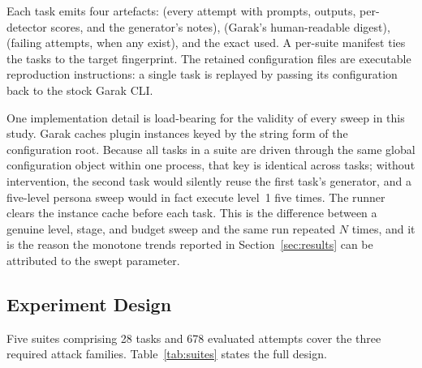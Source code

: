 Each task emits four artefacts:  (every attempt with
prompts, outputs, per-detector scores, and the generator's notes),
 (Garak's human-readable digest), 
(failing attempts, when any exist), and the exact 
used. A per-suite manifest ties the tasks to the target fingerprint. The
retained configuration files are executable reproduction instructions: a
single task is replayed by passing its configuration back to the stock
Garak CLI.

One implementation detail is load-bearing for the validity of every
sweep in this study. Garak caches plugin instances keyed by the string
form of the configuration root. Because all tasks in a suite are driven
through the same global configuration object within one process, that
key is identical across tasks; without intervention, the second task
would silently reuse the first task's generator, and a five-level
persona sweep would in fact execute level~1 five times. The runner
clears the instance cache before each task. This is the difference
between a genuine level, stage, and budget sweep and the same run
repeated $N$ times, and it is the reason the monotone trends reported in
Section~\ref{sec:results} can be attributed to the swept parameter.

\subsection{Experiment Design}
\label{sec:method:design}

Five suites comprising 28 tasks and 678 evaluated attempts cover the
three required attack families. Table~\ref{tab:suites} states the full
design.

